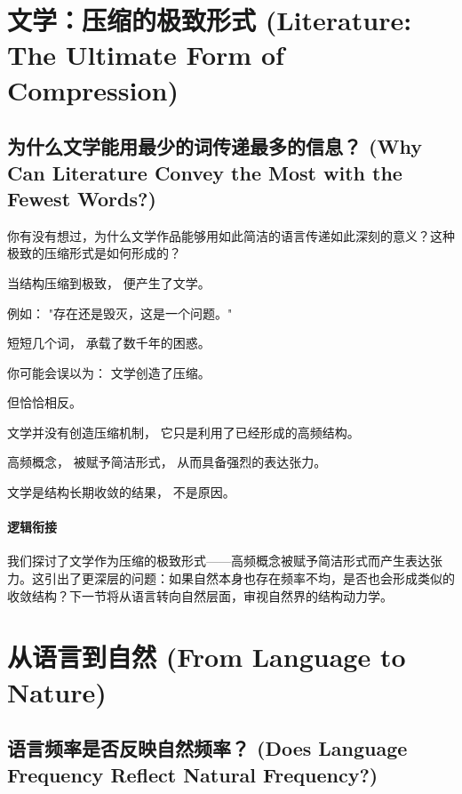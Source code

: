 \documentclass[../main.tex]{subfiles}
\begin{document}
\section{文学：压缩的极致形式 (Literature: The Ultimate Form of Compression)}

\subsection{为什么文学能用最少的词传递最多的信息？ (Why Can Literature Convey the Most with the Fewest Words?)}

\begin{questionbox}
	你有没有想过，为什么文学作品能够用如此简洁的语言传递如此深刻的意义？这种极致的压缩形式是如何形成的？
\end{questionbox}

当结构压缩到极致，
便产生了文学。

例如：
"存在还是毁灭，这是一个问题。"

短短几个词，
承载了数千年的困惑。

\begin{tcolorbox}[colback=yellow!5,title=\textit{读者行为预测}]
	你可能会误以为：
	文学创造了压缩。

	但恰恰相反。
\end{tcolorbox}

文学并没有创造压缩机制，
它只是利用了已经形成的高频结构。

高频概念，
被赋予简洁形式，
从而具备强烈的表达张力。

文学是结构长期收敛的结果，
不是原因。

\paragraph*{逻辑衔接}
我们探讨了文学作为压缩的极致形式——高频概念被赋予简洁形式而产生表达张力。这引出了更深层的问题：如果自然本身也存在频率不均，是否也会形成类似的收敛结构？下一节将从语言转向自然层面，审视自然界的结构动力学。


\section{从语言到自然 (From Language to Nature)}

\subsection{语言频率是否反映自然频率？ (Does Language Frequency Reflect Natural Frequency?)}
\end{document}
